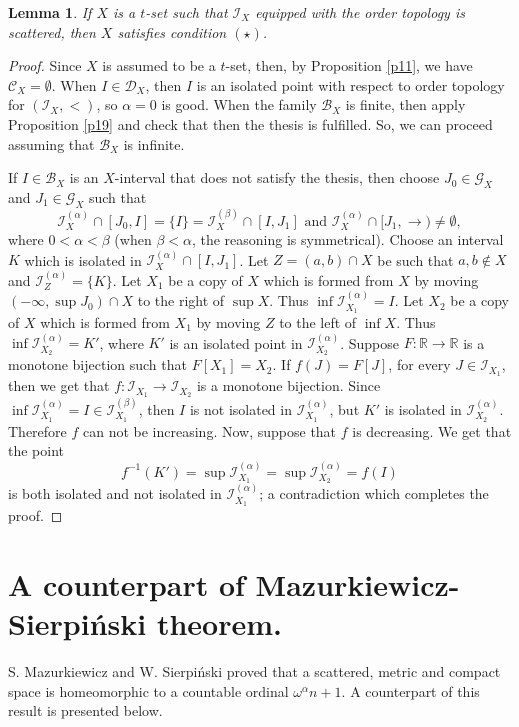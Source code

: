 \documentclass[12pt,a4paper,leqno]{amsart}
\newtheorem{lem}[thm]{Lemma}
\theoremstyle{definition}
\begin{document}
\begin{lem}\label{l23}
 If  $X$ is a $ t $-set such that  $\mathcal I_X$  equipped with  the order topology is scattered, then $X$ satisfies condition $(\star)$. 
   \end{lem} 
\begin{proof} Since $X$ is assumed to be a $t$-set, then, by Proposition \ref{p11}, we have $\mathcal C_X=\emptyset$. When $I\in \mathcal D_X$, then $I$ is an isolated point with respect to order topology for $(\mathcal I_X,< )$, so $\alpha =0$ is good.
  When the family $\mathcal B_X$ is finite, then apply Proposition \ref{p19} and check that then the thesis  is fulfilled. So, we can proceed assuming  that $\mathcal B_X$ is infinite.
	
	If $ I\in \mathcal B_X$  is an  $X$-interval that does not satisfy the thesis, then   choose $J_0\in \mathcal G_X $ and $ J_1\in \mathcal G_X$ such that 
	 $$\mathcal I_X^{(\alpha)} \cap [J_0, I] = \{I\} = \mathcal I_X^{(\beta)} \cap [I, J_1] \mbox{ and } \mathcal I_X^{(\alpha)} \cap [J_1,\rightarrow) \not= \emptyset,$$
	where $0 <\alpha <\beta$ (when $\beta < \alpha $, the reasoning is symmetrical). Choose an interval $K$ which is isolated in $\mathcal I_X^{(\alpha)} \cap [I, J_1]$. Let $Z=(a,b) \cap X$ be such that $a,b \not\in X$ and $ \mathcal I_Z^{(\alpha)}=\{K\}$. Let $X_1$ be a copy of $X$ which is formed from $X$ by moving $(-\infty, \sup J_0) \cap X$ to the right of $\sup X$. Thus $\inf \mathcal I_{X_1}^{(\alpha)} =I$. Let $X_2$ be a copy of $X$ which is formed from $X_1$ by moving $Z$ to the left  of   $\inf X$. Thus $\inf \mathcal I_{X_2}^{(\alpha)} =K'$, where $K'$ is an isolated point in $\mathcal I_{X_2}^{(\alpha)}$. Suppose  $F\colon \mathbb R \to \mathbb R$ is a monotone bijection such that $F[X_1] =X_2$.  If $f(J) = F[J]$, for every $J\in \mathcal I_{X_1}$, then we get that $f\colon \mathcal I_{X_1}\to\mathcal I_{X_2}$ is a monotone bijection.  Since $\inf \mathcal I_{X_1}^{(\alpha)} =I \in  \mathcal I_{X_1}^{(\beta)}$, then $I$ is not isolated in $\mathcal I_{X_1}^{(\alpha)}$, but $K'$ is isolated in $\mathcal I_{X_2}^{(\alpha)}$. Therefore $f$ can not be increasing. Now, suppose that $f$ is decreasing. We get that the point $$f^{-1}(K')=\sup \mathcal I_{X_1}^{(\alpha)} =\sup \mathcal I_{X_2}^{(\alpha)}= f(I)$$ is both  isolated  and not isolated  in $\mathcal I_{X_1}^{(\alpha)}$; a contradiction which completes the proof.
  \end{proof}
	
	
	
	\section{A counterpart of Mazurkiewicz-Sierpiński theorem. }
S. Mazurkiewicz and W. Sierpiński \cite{ms} proved that a scattered, metric and compact space is homeomorphic to a countable ordinal $\omega^\alpha n +1$. A counterpart of this result is presented  below.
\end{document}
